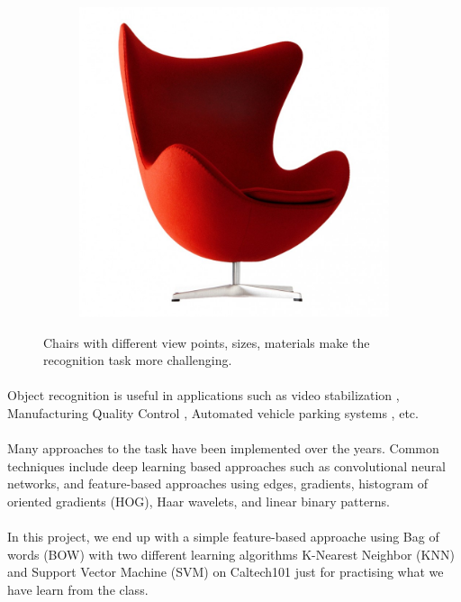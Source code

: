 \begin{figure}[h!]
\begin{subfigure}[b]{0.2\linewidth}
		\includegraphics[width=\linewidth]{images/chairs/5.jpg}
	\end{subfigure}
  	\caption[Object recognition challanges example]{Chairs with different view points, sizes, materials make the recognition task more challenging.}
\end{figure}

\paragraph*{}
Object recognition is useful in applications such as video stabilization \cite{ARTICLE:0}, Manufacturing Quality Control \cite{BOOK:0}, Automated vehicle parking systems \cite{BOOK:1}, etc. 

\paragraph*{}
Many approaches to the task have been implemented over the years. Common techniques include deep learning based approaches such as convolutional neural networks, and feature-based approaches using edges, gradients, histogram of oriented gradients (HOG), Haar wavelets, and linear binary patterns.

\paragraph*{}
In this project, we end up with a simple feature-based approache using Bag of words (BOW) with two different learning algorithms K-Nearest Neighbor (KNN) and Support Vector Machine (SVM) on Caltech101 just for practising what we have learn from the class.
